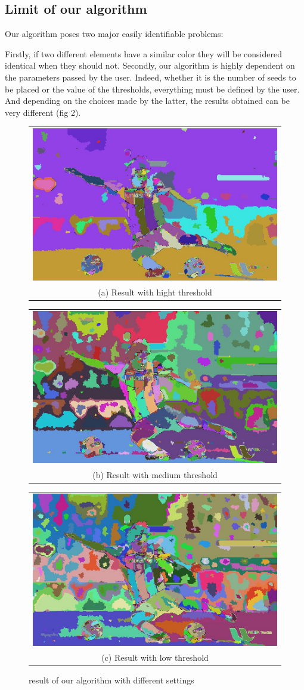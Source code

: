 \documentclass[conference]{IEEEtran}
\begin{document}
\subsection{Limit of our algorithm}

Our algorithm poses two major easily identifiable problems:

Firstly, if two different elements have a similar color they will be considered identical when they should not.
Secondly, our algorithm is highly dependent on the parameters passed by the user. Indeed, whether it is the number of seeds to be placed or the value of the thresholds, everything must be defined by the user. And depending on the choices made by the latter, the results obtained can be very different (fig 2).

\begin{figure}[h!]
  \centering
  \begin{tabular}{@{}c@{}}
    \includegraphics[width=0.4\linewidth]{fig7.jpg} \\[\abovecaptionskip]
    \small (a) Result with hight threshold
  \end{tabular}
  \begin{tabular}{@{}c@{}}
    \includegraphics[width=0.4\linewidth]{fig8.jpg} \\[\abovecaptionskip]
    \small (b) Result with medium  threshold
  \end{tabular}

  \vspace{\floatsep}

  \begin{tabular}{@{}c@{}}
    \includegraphics[width=0.7\linewidth]{fig9.jpg} \\[\abovecaptionskip]
    \small (c) Result with low threshold
  \end{tabular}
  \caption{result of our algorithm with different settings}
  \label{fig 2}
  
\end{figure}
\end{document}
